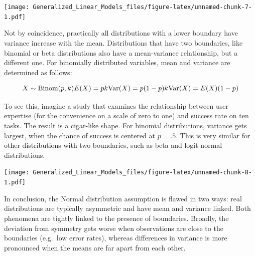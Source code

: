 \documentclass[]{svmono}
\newenvironment{Shaded}{\begin{snugshade}}{\end{snugshade}}
\newcommand{\KeywordTok}[1]{\textcolor[rgb]{0.13,0.29,0.53}{\textbf{#1}}}
\newcommand{\DataTypeTok}[1]{\textcolor[rgb]{0.13,0.29,0.53}{#1}}
\newcommand{\DecValTok}[1]{\textcolor[rgb]{0.00,0.00,0.81}{#1}}
\newcommand{\StringTok}[1]{\textcolor[rgb]{0.31,0.60,0.02}{#1}}
\newcommand{\OperatorTok}[1]{\textcolor[rgb]{0.81,0.36,0.00}{\textbf{#1}}}
\newcommand{\NormalTok}[1]{#1}
\theoremstyle{definition}
\theoremstyle{definition}
\theoremstyle{definition}
\theoremstyle{remark}
\begin{document}
\texttt{[image: Generalized\_Linear\_Models\_files/figure-latex/unnamed-chunk-7-1.pdf]}

Not by coincidence, practically all distributions with a lower boundary
have variance increase with the mean. Distributions that have two
boundaries, like binomial or beta distributions also have a
mean-variance relationship, but a different one. For binomially
distributed variables, mean and variance are determined as follows:

\[
X \sim \textrm{Binom}(p, k)\\
E(X) = p k\\
\textrm{Var}(X) = p (1-p) k\\
\textrm{Var}(X) = E(X)(1-p)
\]

To see this, imagine a study that examines the relationship between user
expertise (for the convenience on a scale of zero to one) and success
rate on ten tasks. The result is a cigar-like shape. For binomial
distributions, variance gets largest, when the chance of success is
centered at \(p = .5\). This is very similar for other distributions
with two boundaries, such as beta and logit-normal distributions.

\begin{Shaded}
\end{Shaded}

\texttt{[image: Generalized\_Linear\_Models\_files/figure-latex/unnamed-chunk-8-1.pdf]}

In conclusion, the Normal distribution assumption is flawed in two ways:
real distributions are typically asymmetric and have mean and variance
linked. Both phenomena are tightly linked to the presence of boundaries.
Broadly, the deviation from symmetry gets worse when observations are
close to the boundaries (e.g.~low error rates), whereas differences in
variance is more pronounced when the means are far apart from each
other.
\end{document}
